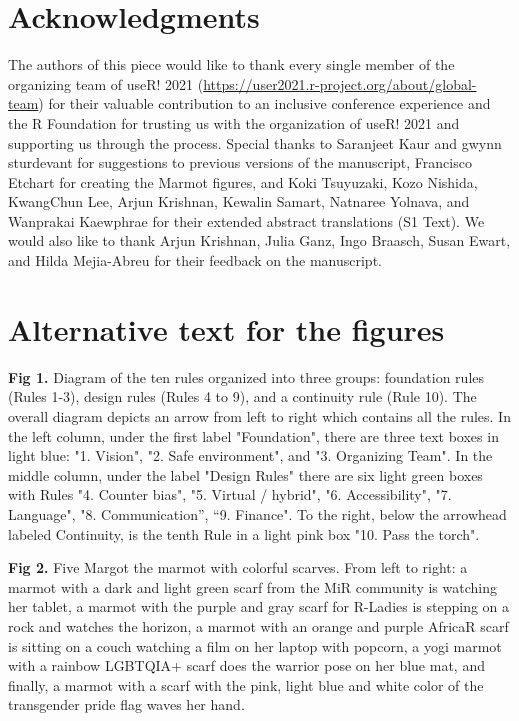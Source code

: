 \documentclass[10pt,letterpaper]{article}
\begin{document}
\section*{Acknowledgments}
The authors of this piece would like to thank every single member of the organizing team of useR! 2021 (\url{https://user2021.r-project.org/about/global-team}) for their valuable contribution to an inclusive conference experience and the R Foundation for trusting us with the organization of useR! 2021 and supporting us through the process. Special thanks to Saranjeet Kaur and gwynn sturdevant for suggestions to previous versions of the manuscript, Francisco Etchart for creating the Marmot figures, and Koki Tsuyuzaki, Kozo Nishida, KwangChun Lee, Arjun Krishnan, Kewalin Samart, Natnaree Yolnava, and Wanprakai Kaewphrae for their extended abstract translations (S1 Text). We would also like to thank Arjun Krishnan, Julia Ganz, Ingo Braasch, Susan Ewart, and Hilda Mejia-Abreu for their feedback on the manuscript.

\section*{Alternative text for the figures}

\textbf{Fig 1.} Diagram of the ten rules organized into three groups: foundation rules (Rules 1-3), design rules (Rules 4 to 9), and a continuity rule (Rule 10). The overall diagram depicts an arrow from left to right which contains all the rules. In the left column, under the first label "Foundation", there are three text boxes in light blue: "1. Vision", "2. Safe environment", and "3. Organizing Team". In the middle column, under the label "Design Rules" there are six light green boxes with Rules "4. Counter bias", "5. Virtual / hybrid", "6. Accessibility", "7. Language", "8. Communication”, “9. Finance". To the right, below the arrowhead labeled Continuity, is the tenth Rule in a light pink box "10. Pass the torch". 
 
\textbf{Fig 2.}  Five Margot the marmot with colorful scarves. From left to right: a marmot with a dark and light green scarf from the MiR community is watching her tablet, a marmot with the purple and gray scarf for R-Ladies is stepping on a rock and watches the horizon, a marmot with an orange and purple AfricaR scarf is sitting on a couch watching a film on her laptop with popcorn, a yogi marmot with a rainbow LGBTQIA+ scarf does the warrior pose on her blue mat, and finally, a marmot with a scarf with the pink, light blue and white color of the transgender pride 
flag waves her hand.
\end{document}
